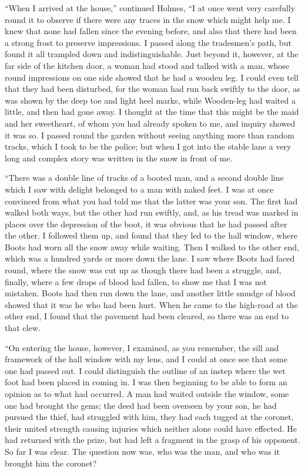 “When I arrived at the house,” continued Holmes, “I at
once went very carefully round it to observe if there were any
traces in the snow which might help me. I knew that none
had fallen since the evening before, and also that there had
been a strong frost to preserve impressions. I passed along
the tradesmen’s path, but found it all trampled down and
indistinguishable. Just beyond it, however, at the far side of
the kitchen door, a woman had stood and talked with a man,
whose round impressions on one side showed that he had a
wooden leg. I could even tell that they had been disturbed,
for the woman had run back swiftly to the door, as was shown
by the deep toe and light heel marks, while Wooden-leg had
waited a little, and then had gone away. I thought at the
time that this might be the maid and her sweetheart, of whom
you had already spoken to me, and inquiry showed it was so.
I passed round the garden without seeing anything more than
random tracks, which I took to be the police; but when I got
into the stable lane a very long and complex story was written
in the snow in front of me.

“There was a double line of tracks of a booted man, and
a second double line which I saw with delight belonged to a
man with naked feet. I was at once convinced from what you
had told me that the latter was your son. The first had
walked both ways, but the other had run swiftly, and, as his
tread was marked in places over the depression of the boot, it
was obvious that he had passed after the other. I followed
them up, and found that they led to the hall window, where
Boots had worn all the snow away while waiting. Then I
walked to the other end, which was a hundred yards or more
down the lane. I saw where Boots had faced round, where
the snow was cut up as though there had been a struggle, and,
finally, where a few drops of blood had fallen, to show me
that I was not mistaken. Boots had then run down the lane,
and another little smudge of blood showed that it was he who
had been hurt. When he came to the high-road at the other
end, I found that the pavement had been cleared, so there
was an end to that clew.

“On entering the house, however, I examined, as you remember,
the sill and framework of the hall window with my
lens, and I could at once see that some one had passed out.
I could distinguish the outline of an instep where the wet foot
had been placed in coming in. I was then beginning to be
able to form an opinion as to what had occurred. A man had
waited outside the window, some one had brought the gems;
the deed had been overseen by your son, he had pursued the
thief, had struggled with him, they had each tugged at the
coronet, their united strength causing injuries which neither
alone could have effected. He had returned with the prize,
but had left a fragment in the grasp of his opponent. So far
I was clear. The question now was, who was the man, and
who was it brought him the coronet?

